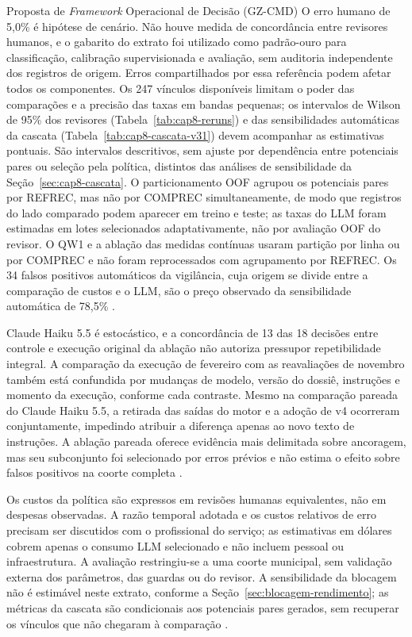 \begin{chapter}{Proposta de \textit{Framework} Operacional de Decisão (GZ-CMD)}
O erro humano de 5,0\% é hipótese de cenário. Não houve medida de concordância entre revisores humanos, e o gabarito do extrato foi utilizado como padrão-ouro para classificação, calibração supervisionada e avaliação, sem auditoria independente dos registros de origem. Erros compartilhados por essa referência podem afetar todos os componentes. Os 247 vínculos disponíveis limitam o poder das comparações e a precisão das taxas em bandas pequenas; os intervalos de Wilson de 95\% dos revisores (Tabela~\ref{tab:cap8-reruns}) e das sensibilidades automáticas da cascata (Tabela~\ref{tab:cap8-cascata-v31}) devem acompanhar as estimativas pontuais. São intervalos descritivos, sem ajuste por dependência entre potenciais pares ou seleção pela política, distintos das análises de sensibilidade da Seção~\ref{sec:cap8-cascata}. O particionamento OOF agrupou os potenciais pares por REFREC, mas não por COMPREC simultaneamente, de modo que registros do lado comparado podem aparecer em treino e teste; as taxas do LLM foram estimadas em lotes selecionados adaptativamente, não por avaliação OOF do revisor. O QW1 e a ablação das medidas contínuas usaram partição por linha ou por COMPREC e não foram reprocessados com agrupamento por REFREC. Os 34 falsos positivos automáticos da vigilância, cuja origem se divide entre a comparação de custos e o LLM, são o preço observado da sensibilidade automática de 78,5\% \cite{Jardim2026phdrepo}.

Claude Haiku 5.5 é estocástico, e a concordância de 13 das 18 decisões entre controle e execução original da ablação não autoriza pressupor repetibilidade integral. A comparação da execução de fevereiro com as reavaliações de novembro também está confundida por mudanças de modelo, versão do dossiê, instruções e momento da execução, conforme cada contraste. Mesmo na comparação pareada do Claude Haiku 5.5, a retirada das saídas do motor e a adoção de v4 ocorreram conjuntamente, impedindo atribuir a diferença apenas ao novo texto de instruções. A ablação pareada oferece evidência mais delimitada sobre ancoragem, mas seu subconjunto foi selecionado por erros prévios e não estima o efeito sobre falsos positivos na coorte completa \cite{Jardim2026phdrepo}.

Os custos da política são expressos em revisões humanas equivalentes, não em despesas observadas. A razão temporal adotada e os custos relativos de erro precisam ser discutidos com o profissional do serviço; as estimativas em dólares cobrem apenas o consumo LLM selecionado e não incluem pessoal ou infraestrutura. A avaliação restringiu-se a uma coorte municipal, sem validação externa dos parâmetros, das guardas ou do revisor. A sensibilidade da blocagem não é estimável neste extrato, conforme a Seção~\ref{sec:blocagem-rendimento}; as métricas da cascata são condicionais aos potenciais pares gerados, sem recuperar os vínculos que não chegaram à comparação \cite{Jardim2026phdrepo}.


\end{chapter}
